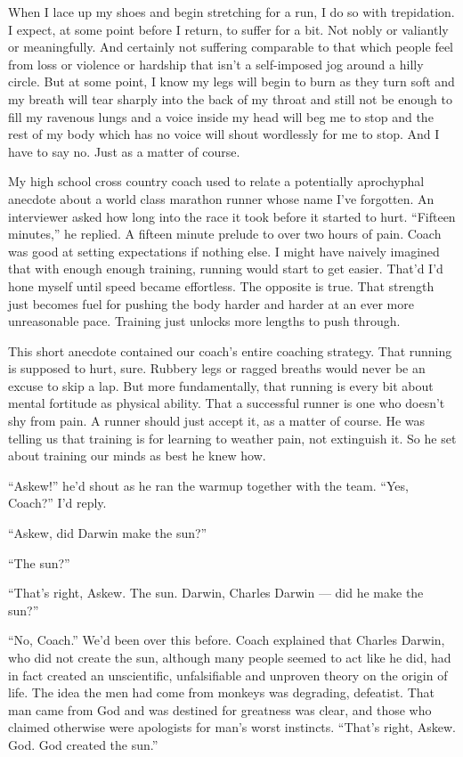 \documentclass[12pt, oneside]{memoir}
\begin{document}
When I lace up my shoes and begin stretching for a run, I do so with
trepidation.
I expect, at some point before I return, to suffer for a bit.
Not nobly or valiantly or meaningfully.
And certainly not suffering comparable to that which people feel from
loss or violence or hardship that isn't a self-imposed jog around a
hilly circle.
But at some point, I know my legs will begin to burn as they turn
soft and my breath will tear sharply into the back of my throat and
still not be enough to fill my ravenous lungs and a voice inside my
head will beg me to stop and the rest of my body which has no voice
will shout wordlessly for me to stop.
And I have to say no.
Just as a matter of course.

My high school cross country coach used to relate a potentially
aprochyphal anecdote about a world class marathon runner whose name
I've forgotten.
An interviewer asked how long into the race it took before it started
to hurt.
``Fifteen minutes,'' he replied.
A fifteen minute prelude to over two hours of pain.
Coach was good at setting expectations if nothing else.
I might have naively imagined that with enough enough training,
running would start to get easier.
That'd I'd hone myself until speed became effortless.
The opposite is true.
That strength just becomes fuel for pushing the body harder and harder
at an ever more unreasonable pace.
Training just unlocks more lengths to push through.

This short anecdote contained our coach's entire coaching strategy.
That running is supposed to hurt, sure.
Rubbery legs or ragged breaths would never be an excuse to skip a lap.
But more fundamentally, that running is every bit about mental
fortitude as physical ability.
That a successful runner is one who doesn't shy from pain.
A runner should just accept it, as a matter of course.
He was telling us that training is for learning to weather pain, not
extinguish it.
So he set about training our minds as best he knew how.

``Askew!'' he'd shout as he ran the warmup together with the team.
``Yes, Coach?'' I'd reply.

``Askew, did Darwin make the sun?''

``The sun?''

``That's right, Askew. The sun. Darwin, Charles Darwin --- did he make
the sun?''

``No, Coach.'' We'd been over this before.
Coach explained that Charles Darwin, who did not create the sun,
although many people seemed to act like he did, had in fact created an
unscientific, unfalsifiable and unproven theory on the origin of life.
The idea the men had come from monkeys was degrading, defeatist.
That man came from God and was destined for greatness was clear, and
those who claimed otherwise were apologists for man's worst instincts.
``That's right, Askew. God. God created the sun.''
\end{document}
